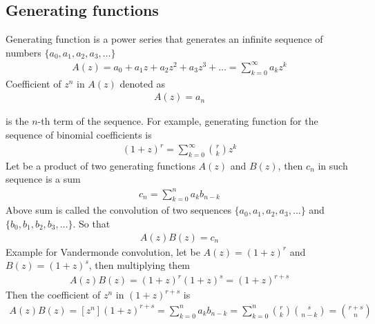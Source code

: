 \subsection{Generating functions}\label{subsec:generating-functions}
Generating function is a power series that generates an infinite sequence of numbers
$\{a_0, a_1, a_2, a_3, \dots \}$
\begin{align*}
    A(z) = a_0 + a_1 z + a_2 z^2 + a_3 z^3 + \dots = \sum_{k=0}^{\infty} a_k z^k
\end{align*}
Coefficient of $z^n$ in $A(z)$ denoted as
\begin{align*}
[z^n]
    A(z) = a_n
\end{align*}

is the $n$-th term of the sequence.
For example, generating function for the sequence of binomial coefficients is
\begin{align*}
    (1+z)^r = \sum_{k=0}^{\infty} \binom{r}{k} z^k
\end{align*}
Let be a product of two generating functions $A(z)$ and $B(z)$, then $c_n$ in such sequence is a sum
\begin{align*}
    c_n = \sum_{k=0}^{n} a_k b_{n-k}
\end{align*}
Above sum is called the convolution of two sequences $\{a_0, a_1, a_2, a_3, \dots \}$ and $\{b_0, b_1, b_2, b_3, \dots \}$.
So that
\begin{align*}
[z^n]
    A(z) B(z) = c_n
\end{align*}
Example for Vandermonde convolution, let be $A(z)=(1+z)^r$ and $B(z)=(1+z)^s$, then multiplying them
\begin{align*}
    A(z) B(z) = (1+z)^{r} (1+z)^{s} = (1+z)^{r+s}
\end{align*}
Then the coefficient of $z^n$ in $(1+z)^{r+s}$ is
\begin{align*}
[z^n]
    A(z) B(z) = [z^n] (1+z)^{r+s} = \sum_{k=0}^{n} a_k b_{n-k}= \sum_{k=0}^{n} \binom{r}{k} \binom{s}{n-k} = \binom{r+s}{n}
\end{align*}
